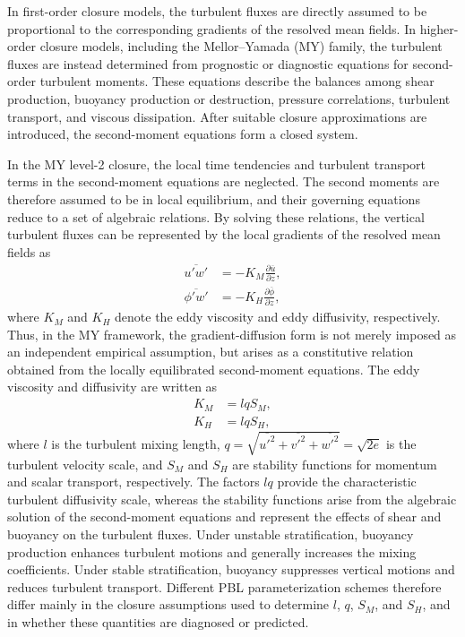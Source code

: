 In first-order closure models, the turbulent fluxes are directly assumed to be proportional to the corresponding gradients of the resolved mean fields.
In higher-order closure models, including the Mellor--Yamada (MY) family, the turbulent fluxes are instead determined from prognostic or diagnostic equations for second-order turbulent moments.
These equations describe the balances among shear production, buoyancy production or destruction, pressure correlations, turbulent transport, and viscous dissipation.
After suitable closure approximations are introduced, the second-moment equations form a closed system.


In the MY level-2 closure, the local time tendencies and turbulent transport terms in the second-moment equations are neglected.
The second moments are therefore assumed to be in local equilibrium, and their governing equations reduce to a set of algebraic relations.
By solving these relations, the vertical turbulent fluxes can be represented by the local gradients of the resolved mean fields as
%
\begin{align}
 \overline{u'w'}
 &= -K_M \frac{\partial \overline{u}}{\partial z}, \label{eq:eddy_visc_hypo}\\
 \overline{\phi'w'}
 &= -K_H \frac{\partial \overline{\phi}}{\partial z} \label{eq:eddy_diff_hypo},
\end{align}
%
where $K_M$ and $K_H$ denote the eddy viscosity and eddy diffusivity, respectively.
Thus, in the MY framework, the gradient-diffusion form is not merely imposed as an independent empirical assumption, 
but arises as a constitutive relation obtained from the locally equilibrated second-moment equations.
The eddy viscosity and diffusivity are written as
%
\begin{align}
 K_M &= l q S_M, \\
 K_H &= l q S_H,
\label{eq:eddy_viscdiff_1.5ord_tb_closure}
\end{align}
%
where $l$ is the turbulent mixing length, 
$q=\sqrt{\overline{u'^2}+\overline{v'^2}+\overline{w'^2}}=\sqrt{2e}$ is the turbulent velocity scale,
and $S_M$ and $S_H$ are stability functions for momentum and scalar transport, respectively.
The factors $lq$ provide the characteristic turbulent diffusivity scale, 
whereas the stability functions arise from the algebraic solution of the second-moment equations and represent the effects of shear and buoyancy on the turbulent fluxes.
Under unstable stratification, buoyancy production enhances turbulent motions and generally increases the mixing coefficients.
Under stable stratification, buoyancy suppresses vertical motions and reduces turbulent transport.
Different PBL parameterization schemes therefore differ mainly in the closure assumptions used to determine $l$, $q$, $S_M$, and $S_H$, 
and in whether these quantities are diagnosed or predicted.


